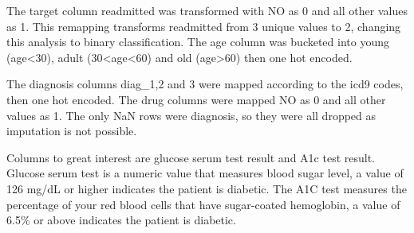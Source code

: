 \documentclass[5p]{elsarticle} %
\begin{document}
The target column readmitted was transformed with NO as 0 and all other
values as 1. This remapping transforms readmitted from 3 unique values
to 2, changing this analysis to binary classification. The age column
was bucketed into young (age\textless30), adult
(30\textless age\textless60) and old (age\textgreater60) then one hot
encoded.

The diagnosis columns diag\_1,2 and 3 were mapped according to the icd9
codes, then one hot encoded. The drug columns were mapped NO as 0 and
all other values as 1. The only NaN rows were diagnosis, so they were
all dropped as imputation is not possible.

Columns to great interest are glucose serum test result and A1c test
result. Glucose serum test is a numeric value that measures blood sugar
level, a value of 126 mg/dL or higher indicates the patient is diabetic.
The A1C test measures the percentage of your red blood cells that have
sugar-coated hemoglobin, a value of 6.5\% or above indicates the patient
is diabetic.

\clearpage
\onecolumn
\end{document}
